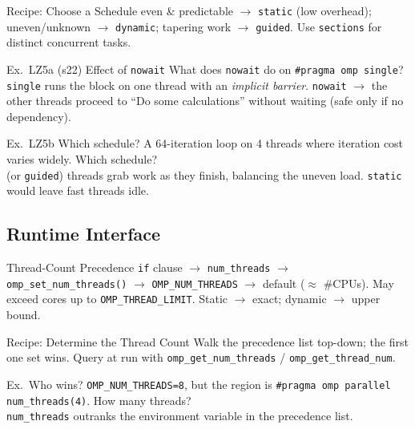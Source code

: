 \begin{KR}{Recipe: Choose a Schedule}
    even \& predictable $\to$ \texttt{static} (low overhead); uneven/unknown $\to$ \texttt{dynamic}; tapering work $\to$ \texttt{guided}. Use \texttt{sections} for distinct concurrent tasks.
\end{KR}

\begin{example2}{Ex.\ LZ5a (s22) Effect of \texttt{nowait}}
    What does \texttt{nowait} do on \texttt{\#pragma omp single}?
     \\ 
    \texttt{single} runs the block on one thread with an \emph{implicit barrier}. \texttt{nowait}  $\to$ the other threads proceed to ``Do some calculations'' without waiting (safe only if no dependency).
\end{example2}

\begin{example2}{Ex.\ LZ5b Which schedule?}
    A 64-iteration loop on 4 threads where iteration cost varies widely. Which schedule?
     \\ 
     (or \texttt{guided}) threads grab work as they finish, balancing the uneven load. \texttt{static} would leave fast threads idle.
\end{example2}

\raggedcolumns
\columnbreak

\subsection{Runtime Interface}

\begin{definition}{Thread-Count Precedence}
    \texttt{if} clause $\to$ \texttt{num\_threads} $\to$ \texttt{omp\_set\_num\_threads()} $\to$ \texttt{OMP\_NUM\_THREADS} $\to$ default ($\approx$ \#CPUs). May exceed cores up to \texttt{OMP\_THREAD\_LIMIT}. Static $\to$ exact; dynamic $\to$ upper bound.
\end{definition}

\begin{KR}{Recipe: Determine the Thread Count}
    Walk the precedence list top-down; the first one set wins. Query at run with \texttt{omp\_get\_num\_threads} / \texttt{omp\_get\_thread\_num}.
\end{KR}

\begin{example2}{Ex.\ Who wins?}
    \texttt{OMP\_NUM\_THREADS=8}, but the region is \texttt{\#pragma omp parallel num\_threads(4)}. How many threads?
     \\ 
     \texttt{num\_threads} outranks the environment variable in the precedence list.
\end{example2}

